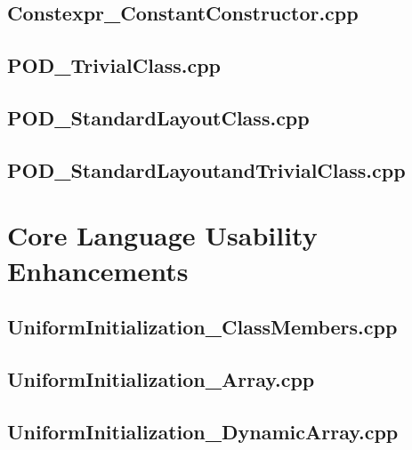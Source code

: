 \documentclass[11pt]{report}
\newcommand{\Cpp}{\lstset{language=C++,keywordstyle=\bfseries,breaklines,breakindent=30pt}}
\begin{document}
\begin{appendix}
\subsection{Constexpr\_ConstantConstructor.cpp}
\label{Constexpr_ConstantConstructor}


\subsection{POD\_TrivialClass.cpp}
\label{POD_TrivialClass}


\subsection{POD\_StandardLayoutClass.cpp}
\label{POD_StandardLayoutClass}


\subsection{POD\_StandardLayoutandTrivialClass.cpp}
\label{POD_StandardLayoutandTrivialClass}


\section{Core Language Usability Enhancements}
\label{Appendix: corelanguage usabiliy enhancements}

\Cpp

\subsection{UniformInitialization\_ClassMembers.cpp}
\label{UniformInitialization_ClassMembers}


\subsection{UniformInitialization\_Array.cpp}
\label{UniformInitialization_Array}


\subsection{UniformInitialization\_DynamicArray.cpp}
\label{UniformInitialization_DynamicArray}



\end{appendix}
\end{document}
